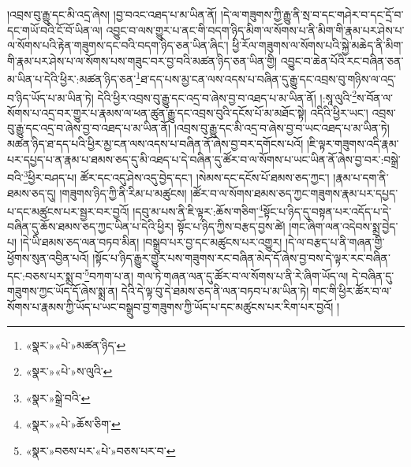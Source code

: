 །འབྲས་བུ་རྒྱུ་དང་མི་འདྲ་ཞེས། །བྱ་བའང་འཐད་པ་མ་ཡིན་ནོ། །དེ་ལ་གཟུགས་ཀྱི་རྒྱུ་ནི་སྲ་བ་དང་གཤེར་བ་དང་དྲོ་བ་དང་གཡོ་བའི་ངོ་བོ་ཡིན་ལ། འབྱུང་བ་ལས་གྱུར་པ་ནང་གི་བདག་ཉིད་མིག་ལ་སོགས་པ་ནི་མིག་གི་རྣམ་པར་ཤེས་པ་ལ་སོགས་པའི་རྟེན་གཟུགས་དང་བའི་བདག་ཉིད་ཅན་ཡིན་ཞིང་། ཕྱི་རོལ་གཟུགས་ལ་སོགས་པའི་སྐྱེ་མཆེད་ནི་མིག་གི་རྣམ་པར་ཤེས་པ་ལ་སོགས་པས་གཟུང་བར་བྱ་བའི་མཚན་ཉིད་ཅན་ཡིན་གྱི། འབྱུང་བ་ཆེན་པོའི་རང་བཞིན་ཅན་མ་ཡིན་པ་དེའི་ཕྱིར་:མཚན་ཉིད་ཅན་\footnote{«སྣར་»«པེ་»མཚན་ཉིད་}ཐ་དད་པས་མྱ་ངན་ལས་འདས་པ་བཞིན་དུ་རྒྱུ་དང་འབྲས་བུ་གཉིས་ལ་འདྲ་བ་ཉིད་ཡོད་པ་མ་ཡིན་ཏེ། དེའི་ཕྱིར་འབྲས་བུ་རྒྱུ་དང་འདྲ་བ་ཞེས་བྱ་བ་འཐད་པ་མ་ཡིན་ནོ། །:སཱ་ལུའི་\footnote{«སྣར་»«པེ་»ས་ལུའི་}ས་བོན་ལ་སོགས་པ་འདྲ་བར་གྱུར་པ་རྣམས་ལ་ཕན་ཚུན་རྒྱུ་དང་འབྲས་བུའི་དངོས་པོ་མ་མཐོང་སྟེ། འདིའི་ཕྱིར་ཡང་། འབྲས་བུ་རྒྱུ་དང་འདྲ་བ་ཞེས་བྱ་བ་འཐད་པ་མ་ཡིན་ནོ། །འབྲས་བུ་རྒྱུ་དང་མི་འདྲ་བ་ཞེས་བྱ་བ་ཡང་འཐད་པ་མ་ཡིན་ཏེ། མཚན་ཉིད་ཐ་དད་པའི་ཕྱིར་མྱ་ངན་ལས་འདས་པ་བཞིན་ནོ་ཞེས་བྱ་བར་དགོངས་པའོ། །ཇི་ལྟར་གཟུགས་འདི་རྣམ་པར་དཔྱད་པ་ན་རྣམ་པ་ཐམས་ཅད་དུ་མི་འཐད་པ་དེ་བཞིན་དུ་ཚོར་བ་ལ་སོགས་པ་ཡང་ཡིན་ནོ་ཞེས་བྱ་བར་:བསྒྲེ་བའི་\footnote{«སྣར་»སྒྲེ་བའི་}ཕྱིར་བཤད་པ། ཚོར་དང་འདུ་ཤེས་འདུ་བྱེད་དང་། །སེམས་དང་དངོས་པོ་ཐམས་ཅད་ཀྱང་། །རྣམ་པ་དག་ནི་ཐམས་ཅད་དུ། །གཟུགས་ཉིད་ཀྱི་ནི་རིམ་པ་མཚུངས། །ཚོར་བ་ལ་སོགས་ཐམས་ཅད་ཀྱང་གཟུགས་རྣམ་པར་དཔྱད་པ་དང་མཚུངས་པར་སྦྱར་བར་བྱའོ། །དབུ་མ་པས་ནི་ཇི་ལྟར་:ཆོས་གཅིག་\footnote{«སྣར་»«པེ་»ཆོས་ཅིག་}སྟོང་པ་ཉིད་དུ་བསྟན་པར་འདོད་པ་དེ་བཞིན་དུ་ཆོས་ཐམས་ཅད་ཀྱང་ཡིན་པ་དེའི་ཕྱིར། སྟོང་པ་ཉིད་ཀྱིས་བརྩད་བྱས་ཚེ། །གང་ཞིག་ལན་འདེབས་སྨྲ་བྱེད་པ། །དེ་ཡི་ཐམས་ཅད་ལན་བཏབ་མིན། །བསྒྲུབ་པར་བྱ་དང་མཚུངས་པར་འགྱུར། །དེ་ལ་བརྩད་པ་ནི་གཞན་གྱི་ཕྱོགས་སུན་འབྱིན་པའོ། །སྟོང་པ་ཉིད་རྒྱུར་གྱུར་པས་གཟུགས་རང་བཞིན་མེད་དོ་ཞེས་བྱ་བས་དེ་ལྟར་རང་བཞིན་དང་:བཅས་པར་སྨྲ་བ་\footnote{«སྣར་»བཅས་པར་«པེ་»བཅས་པར་བ་}བཀག་པ་ན། གལ་ཏེ་གཞན་ལན་དུ་ཚོར་བ་ལ་སོགས་པ་ནི་རེ་ཞིག་ཡོད་ལ། དེ་བཞིན་དུ་གཟུགས་ཀྱང་ཡོད་དོ་ཞེས་སྨྲ་ན། དེའི་དེ་ལྟ་བུ་དེ་ཐམས་ཅད་ནི་ལན་བཏབ་པ་མ་ཡིན་ཏེ། གང་གི་ཕྱིར་ཚོར་བ་ལ་སོགས་པ་རྣམས་ཀྱི་ཡོད་པ་ཡང་བསྒྲུབ་བྱ་གཟུགས་ཀྱི་ཡོད་པ་དང་མཚུངས་པར་རིག་པར་བྱའོ། །

